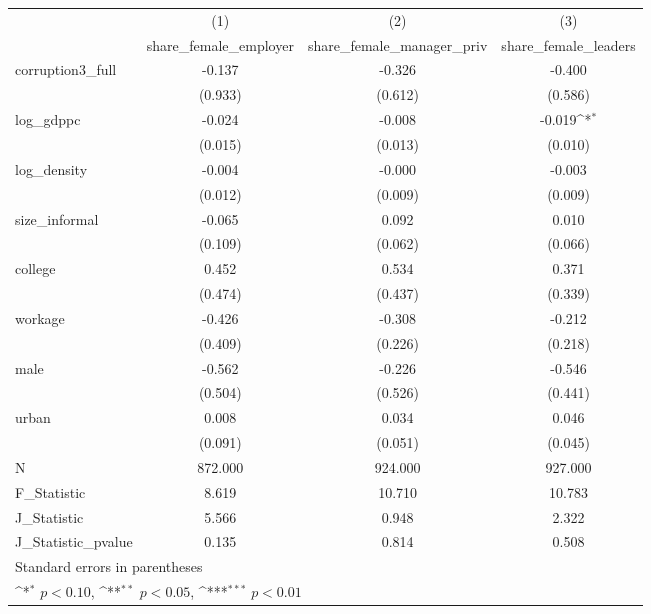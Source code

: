 {
\def\sym#1{\ifmmode^{#1}\else\(^{#1}\)\fi}
\begin{tabular}{l*{3}{c}}
\hline\hline
            &\multicolumn{1}{c}{(1)}&\multicolumn{1}{c}{(2)}&\multicolumn{1}{c}{(3)}\\
            &\multicolumn{1}{c}{share\_female\_employer}&\multicolumn{1}{c}{share\_female\_manager\_priv}&\multicolumn{1}{c}{share\_female\_leaders}\\
\hline
corruption3\_full&      -0.137         &      -0.326         &      -0.400         \\
            &     (0.933)         &     (0.612)         &     (0.586)         \\
[1em]
log\_gdppc   &      -0.024         &      -0.008         &      -0.019\sym{*}  \\
            &     (0.015)         &     (0.013)         &     (0.010)         \\
[1em]
log\_density &      -0.004         &      -0.000         &      -0.003         \\
            &     (0.012)         &     (0.009)         &     (0.009)         \\
[1em]
size\_informal&      -0.065         &       0.092         &       0.010         \\
            &     (0.109)         &     (0.062)         &     (0.066)         \\
[1em]
college     &       0.452         &       0.534         &       0.371         \\
            &     (0.474)         &     (0.437)         &     (0.339)         \\
[1em]
workage     &      -0.426         &      -0.308         &      -0.212         \\
            &     (0.409)         &     (0.226)         &     (0.218)         \\
[1em]
male        &      -0.562         &      -0.226         &      -0.546         \\
            &     (0.504)         &     (0.526)         &     (0.441)         \\
[1em]
urban       &       0.008         &       0.034         &       0.046         \\
            &     (0.091)         &     (0.051)         &     (0.045)         \\
\hline
N           &     872.000         &     924.000         &     927.000         \\
F\_Statistic &       8.619         &      10.710         &      10.783         \\
J\_Statistic &       5.566         &       0.948         &       2.322         \\
J\_Statistic\_pvalue&       0.135         &       0.814         &       0.508         \\
\hline\hline
\multicolumn{4}{l}{\footnotesize Standard errors in parentheses}\\
\multicolumn{4}{l}{\footnotesize \sym{*} \(p<0.10\), \sym{**} \(p<0.05\), \sym{***} \(p<0.01\)}\\
\end{tabular}
}
